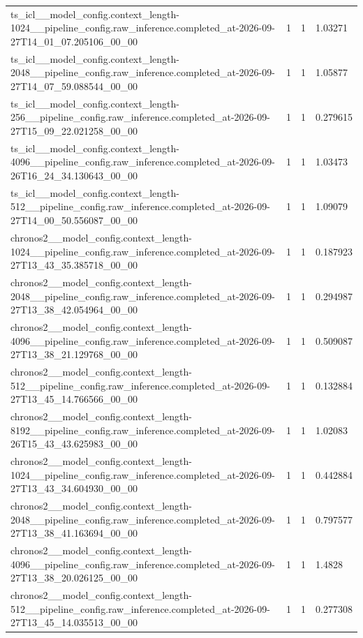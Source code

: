 \begin{tabular}{llll}
ts\_icl\_\_model\_config.context\_length-1024\_\_pipeline\_config.raw\_inference.completed\_at-2026-09-27T14\_01\_07.205106\_00\_00 & 1 & 1 & 1.03271 \\
ts\_icl\_\_model\_config.context\_length-2048\_\_pipeline\_config.raw\_inference.completed\_at-2026-09-27T14\_07\_59.088544\_00\_00 & 1 & 1 & 1.05877 \\
ts\_icl\_\_model\_config.context\_length-256\_\_pipeline\_config.raw\_inference.completed\_at-2026-09-27T15\_09\_22.021258\_00\_00 & 1 & 1 & 0.279615 \\
ts\_icl\_\_model\_config.context\_length-4096\_\_pipeline\_config.raw\_inference.completed\_at-2026-09-26T16\_24\_34.130643\_00\_00 & 1 & 1 & 1.03473 \\
ts\_icl\_\_model\_config.context\_length-512\_\_pipeline\_config.raw\_inference.completed\_at-2026-09-27T14\_00\_50.556087\_00\_00 & 1 & 1 & 1.09079 \\
chronos2\_\_model\_config.context\_length-1024\_\_pipeline\_config.raw\_inference.completed\_at-2026-09-27T13\_43\_35.385718\_00\_00 & 1 & 1 & 0.187923 \\
chronos2\_\_model\_config.context\_length-2048\_\_pipeline\_config.raw\_inference.completed\_at-2026-09-27T13\_38\_42.054964\_00\_00 & 1 & 1 & 0.294987 \\
chronos2\_\_model\_config.context\_length-4096\_\_pipeline\_config.raw\_inference.completed\_at-2026-09-27T13\_38\_21.129768\_00\_00 & 1 & 1 & 0.509087 \\
chronos2\_\_model\_config.context\_length-512\_\_pipeline\_config.raw\_inference.completed\_at-2026-09-27T13\_45\_14.766566\_00\_00 & 1 & 1 & 0.132884 \\
chronos2\_\_model\_config.context\_length-8192\_\_pipeline\_config.raw\_inference.completed\_at-2026-09-26T15\_43\_43.625983\_00\_00 & 1 & 1 & 1.02083 \\
chronos2\_\_model\_config.context\_length-1024\_\_pipeline\_config.raw\_inference.completed\_at-2026-09-27T13\_43\_34.604930\_00\_00 & 1 & 1 & 0.442884 \\
chronos2\_\_model\_config.context\_length-2048\_\_pipeline\_config.raw\_inference.completed\_at-2026-09-27T13\_38\_41.163694\_00\_00 & 1 & 1 & 0.797577 \\
chronos2\_\_model\_config.context\_length-4096\_\_pipeline\_config.raw\_inference.completed\_at-2026-09-27T13\_38\_20.026125\_00\_00 & 1 & 1 & 1.4828 \\
chronos2\_\_model\_config.context\_length-512\_\_pipeline\_config.raw\_inference.completed\_at-2026-09-27T13\_45\_14.035513\_00\_00 & 1 & 1 & 0.277308 \\

\end{tabular}

